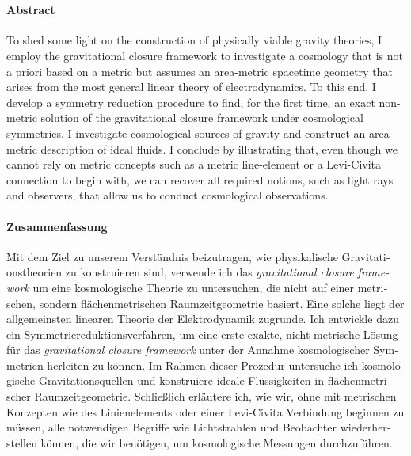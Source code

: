 \cleardoublepage
\thispagestyle{plain}

\makeatletter
\begin{center}
	\large\textbf{\@title}\\
	\normalsize\@author
\end{center}
\makeatother

\paragraph{Abstract}

To shed some light on the construction of physically viable gravity theories, I employ the gravitational closure framework to investigate a cosmology that is not a priori based on a metric but assumes an area-metric spacetime geometry that arises from the most general linear theory of electrodynamics. To this end, I develop a symmetry reduction procedure to find, for the first time, an exact non-metric solution of the gravitational closure framework under cosmological symmetries. I investigate cosmological sources of gravity and construct an area-metric description of ideal fluids. I conclude by illustrating that, even though we cannot rely on metric concepts such as a metric line-element or a Levi-Civita connection to begin with, we can recover all required notions, such as light rays and observers, that allow us to conduct cosmological observations.

\begin{otherlanguage}{ngerman}

\paragraph{Zusammenfassung}

Mit dem Ziel zu unserem Verständnis beizutragen, wie physikalische Gravitationstheorien zu konstruieren sind, verwende ich das \emph{gravitational closure framework} um eine kosmologische Theorie zu untersuchen, die nicht auf einer metrischen, sondern flächenmetrischen Raumzeitgeometrie basiert. Eine solche liegt der allgemeinsten linearen Theorie der Elektrodynamik zugrunde. Ich entwickle dazu ein Symmetriereduktionsverfahren, um eine erste exakte, nicht-metrische Lösung für das \emph{gravitational closure framework} unter der Annahme kosmologischer Symmetrien herleiten zu können. Im Rahmen dieser Prozedur untersuche ich kosmologische Gravitationsquellen und konstruiere ideale Flüssigkeiten in flächenmetrischer Raumzeitgeometrie. Schließlich erläutere ich, wie wir, ohne mit metrischen Konzepten wie des Linienelements oder einer Levi-Civita Verbindung beginnen zu müssen, alle notwendigen Begriffe wie Lichtstrahlen und Beobachter wiederherstellen können, die wir benötigen, um kosmologische Messungen durchzuführen.

\end{otherlanguage}
